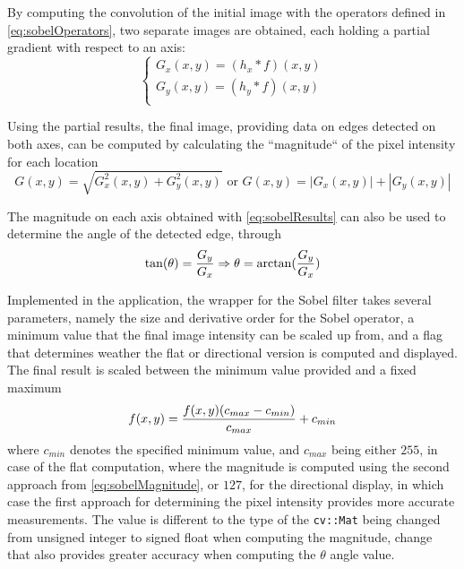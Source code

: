 By computing the convolution of the initial image with the operators defined in \cref{eq:sobelOperators},
two separate images are obtained, each holding a partial gradient with respect to an axis:
\begin{equation}
	\label{eq:sobelResults}
	\begin{cases}
		G_x(x, y) = (h_x * f)(x, y) \\
		G_y(x, y) = (h_y * f)(x, y) \\
	\end{cases}
\end{equation}

Using the partial results, the final image, providing data on edges detected on both axes, can be computed
by calculating the ``magnitude`` of the pixel intensity for each location \cite{ispBook}
\begin{equation}
	\label{eq:sobelMagnitude}
	G(x, y) = \sqrt{G_x^2(x, y) + G_y^2(x, y)}
	\text{ or }
	G(x, y) = |G_x(x, y)| + |G_y(x, y)|
\end{equation}

The magnitude on each axis obtained with \cref{eq:sobelResults} can also be used to determine the angle
of the detected edge, through \cite{ispBook}
\begin{equation}
	\label{eq:sobelTheta}
	\tan(\theta) = {G_y\over{G_x}} \Rightarrow \theta = \arctan({G_y\over{G_x}})
\end{equation}

Implemented in the application, the wrapper for the Sobel filter takes several parameters, namely the size
and derivative order for the Sobel operator, a minimum value that the final image intensity can be scaled
up from, and a flag that determines weather the flat or directional version is computed and displayed.
The final result is scaled between the minimum value provided and a fixed maximum
\begin{equation}
	\label{eq:sobelScaling}
	f(x, y) = {f(x, y)(c_{max} - c_{min})\over{c_{max}}} + c_{min}
\end{equation}
where \(c_{min}\) denotes the specified minimum value, and \(c_{max}\) being either \(255\), in case of the flat
computation, where the magnitude is computed using the second approach from \cref{eq:sobelMagnitude}, or \(127\),
for the directional display, in which case the first approach for determining the pixel intensity provides
more accurate measurements. The value is different to the type of the \verb|cv::Mat| being changed from
unsigned integer to signed float when computing the magnitude, change that also provides greater accuracy when
computing the \(\theta\) angle value.

